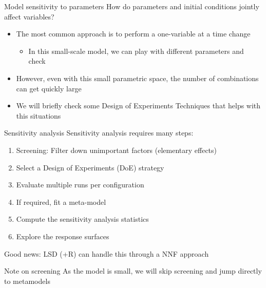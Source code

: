 \documentclass[bigger,aspectratio=169]{beamer}
\begin{document}
\begin{frame}[label={sec:org0e451e9}]{Model sensitivity to parameters}
How do parameters and initial conditions \alert{jointly} affect variables?

\begin{itemize}
\item The most common approach is to perform a one-variable at a time change
\begin{itemize}
\item In this small-scale model, we can play with different parameters and check
\end{itemize}
\item However, even with this small parametric space, the number of combinations can get quickly large
\item We will briefly check some Design of Experiments Techniques that helps with this situations
\end{itemize}
\end{frame}
\begin{frame}[label={sec:org4354334}]{Sensitivity analysis}
Sensitivity analysis requires many steps:

\begin{enumerate}
\item Screening: Filter down unimportant factors (elementary effects)
\item Select a \alert{Design of Experiments} (DoE) strategy
\item Evaluate multiple runs per configuration
\item If required, fit a \alert{meta-model}
\item Compute the sensitivity analysis \alert{statistics}
\item Explore the \alert{response surfaces}
\end{enumerate}

\alert{Good news:} LSD (+R) can handle this through a NNF approach
\begin{block}{Note on screening}
As the model is small, we will skip screening and jump directly to metamodels
\end{block}
\end{frame}
\end{document}
